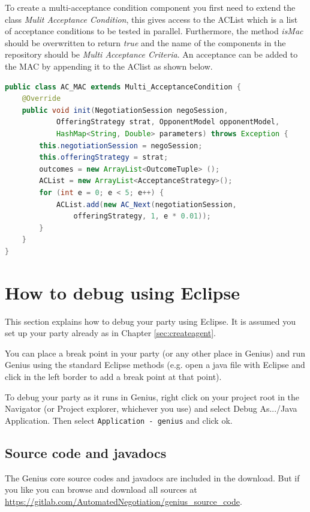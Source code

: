 \documentclass[]{llncs}
\newcommand{\source}{\url{https://gitlab.com/AutomatedNegotiation/genius_source_code}}
\newcommand\Genius{{\sc Genius}}
\begin{document}
To create a multi-acceptance condition component you first need to extend the class \textit{Mulit Acceptance Condition}, this gives access to the ACList which is a list of acceptance conditions to be tested in parallel. Furthermore, the method \textit{isMac} should be overwritten to return \textit{true} and the name of the components in the repository should be \textit{Multi Acceptance Criteria}. An acceptance can be added to the MAC by appending it to the AClist as shown below. 

\begin{lstlisting}[language=Java, caption={Example code for Acceptance condition}]
public class AC_MAC extends Multi_AcceptanceCondition {
	@Override
	public void init(NegotiationSession negoSession, 
			OfferingStrategy strat, OpponentModel opponentModel, 
			HashMap<String, Double> parameters) throws Exception {
		this.negotiationSession = negoSession;
		this.offeringStrategy = strat;
		outcomes = new ArrayList<OutcomeTuple> ();
		ACList = new ArrayList<AcceptanceStrategy>();
		for (int e = 0; e < 5; e++) {
			ACList.add(new AC_Next(negotiationSession, 
				offeringStrategy, 1, e * 0.01));
		}
	}
}
\end{lstlisting}





\section{How to debug using Eclipse}\label{sec:debugging}
This section explains how to debug your party using Eclipse. It is assumed you set up your party already as in Chapter \ref{sec:createagent}.

You can place a break point in your party (or any other place in {\Genius}) and run {\Genius} using the standard Eclipse methods (e.g. open a java file with Eclipse and click in the left border to add a break point at that point).

To debug your party as it runs in {\Genius}, right click on your project root in the Navigator (or Project explorer, whichever you use) and select Debug As.../Java Application. Then select \verb|Application - genius| and click ok.

\subsection{Source code and javadocs}
The {\Genius} core source codes and javadocs are included in the download. But if you like you can browse and download all sources at {\source}.
\end{document}
